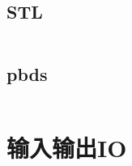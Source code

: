 \documentclass[twoside,sub3section,UTF8]{ctexart}						%
\begin{document}
	\subsection{STL}
	\inputminted{c++}{"Other/STL.cpp"}
	\subsection{pbds}
	\inputminted{c++}{"Other/pbds.cpp"}

\newpage
\section{输入输出IO}
\end{document}
